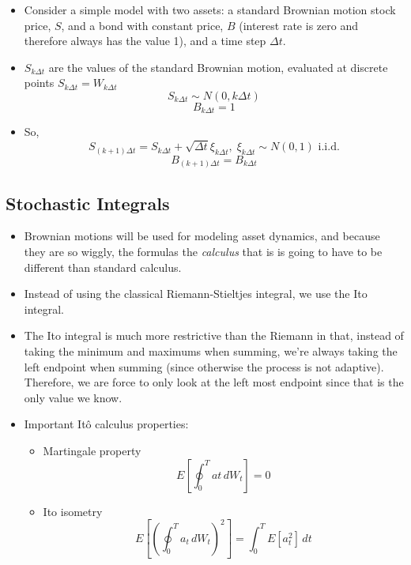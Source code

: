 \documentclass[11pt]{article}
\begin{document}
\begin{itemize}
    \item Consider a simple model with two assets: a standard Brownian motion stock price,
    $S$, and a bond with constant price, $B$ (interest rate is zero and therefore always has 
    the value 1), and a time step $\Delta t$.
    \item $S_{k \Delta t}$ are the values of the standard Brownian motion, evaluated at 
    discrete points $S_{k \Delta t} = W_{k \Delta t}$
        \[S_{k \Delta t} \sim N(0, k \Delta t)\]
        \[B_{k \Delta t} = 1\]
    \item So, 
        \[ 
        S_{(k+1) \Delta t} 
        = S_{k \Delta t} + \sqrt{\Delta t} \xi_{k \Delta t}, 
        \; \xi_{k \Delta t} \sim N(0,1) \text{ i.i.d.}
        \]
        \[
        B_{(k+1)\Delta t} = B_{k \Delta t}    
        \]
\end{itemize}


\subsection{Stochastic Integrals}
\begin{itemize}
    \item Brownian motions will be used for modeling asset dynamics, and because they are so 
    wiggly, the formulas \- the \textit{calculus} that is \- is going to have to be different 
    than standard calculus. 
    \item Instead of using the classical Riemann-Stieltjes integral, we use the Ito integral. 
\end{itemize}

\begin{itemize}
    \item The Ito integral is much more restrictive than the Riemann in that, instead of 
    taking the minimum and maximums when summing, we're always taking the left endpoint when 
    summing (since otherwise the process is not adaptive). Therefore, we are force to only 
    look at the left most endpoint since that is the only value we know. 
    \item Important It\^{o} calculus properties: 
    \begin{itemize}
        \item Martingale property 
        \[ E\left[\oint_{0}^{T} at \, dW_t \right] = 0\]
        \item Ito isometry
        \[ E \left[{\left(\oint_0^T a_t \, dW_t\right)}^2\right] = \int_{0}^{T} E[a_t^2] \, dt\]
    \end{itemize}
\end{itemize}
\end{document}
